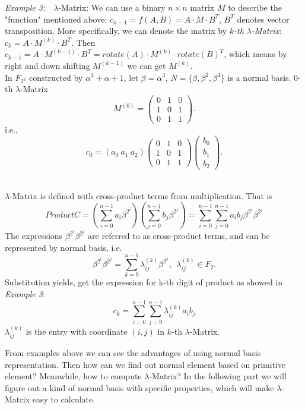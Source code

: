 \documentclass[conference]{IEEEtran}
\begin{document}
\textit{Example 3:}\ \ $\lambda$-Matrix: We can use a binary $n\times n$ matrix $M$ to describe the "function"
 mentioned above: $c_{n-1} = f(A, B) = A \cdot M \cdot B^T$, $B^T$ denotes vector transposition. 
More specifically, we can denote the matrix by \emph{$k$-th $\lambda$-Matrix}: $c_k = A \cdot M^{(k)} \cdot B^T$.
Then $c_{k-1} = A \cdot M^{(k-1)} \cdot B^T = rotate(A) \cdot M^{(k)} \cdot rotate(B)^T$, which means
by right and down shifting $M^{(k-1)}$ we can get $M^{(k)}$.\\
In $F_{2^3}$ constructed by $\alpha^3 + \alpha + 1$, let $\beta = \alpha^3$, $N = \{ \beta, \beta^2, \beta^4\}$ 
is a normal basis. $0$-th $\lambda$-Matrix
\begin{equation}
M^{(0)} = \left(
\begin{array} {lcr}
0 & 1 & 0\\
1 & 0 & 1\\
0 & 1 & 1
\end{array} \right).
\end{equation}
i.e.,
\begin{equation}
c_0 = (a_0\  a_1\  a_2)\left(
\begin{array} {lcr}
0 & 1 & 0\\
1 & 0 & 1\\
0 & 1 & 1
\end{array} \right)\left(
\begin{array} {lcr}
b_0\\
b_1\\
b_2
\end{array} \right).
\end{equation}

\indent \\
$\lambda$-Matrix is defined with cross-product terms from multiplication. That is 
\begin{equation}
Product C = (\sum_{i=0}^{n-1}a_i\beta^{2^i})(\sum_{j=0}^{n-1}b_j\beta^{2^j}) = \sum_{i=0}^{n-1}\sum_{j=0}^{n-1}a_ib_j\beta^{2^i}\beta^{2^j}
\end{equation}
The expressions $\beta^{2^i}\beta^{2^j}$ are referred to as cross-product terms, and can be represented by
normal basis, i.e.
\begin{equation}
\beta^{2^i}\beta^{2^j} = \sum_{k=0}^{n-1}\lambda_{ij}^{(k)}\beta^{2^k}, \ \ \lambda_{ij}^{(k)} \in F_2.
\end{equation}
Substitution yields, get the expression for k-th digit of product as showed in \textit{Example 3}:
\begin{equation}
c_k = \sum_{i=0}^{n-1}\sum_{j=0}^{n-1}\lambda_{ij}^{(k)}a_ib_j
\end{equation}
$\lambda_{ij}^{(k)}$ is the entry with coordinate $(i,j)$ in $k$-th $\lambda$-Matrix.\par
From examples above we can see the advantages of using normal basis representation. Then how can we find out
normal element based on primitive element? Meanwhile, how to compute $\lambda$-Matrix? In the following part
we will figure out a kind of normal basis with specific properties, which will make $\lambda$-Matrix easy to calculate.
\end{document}
